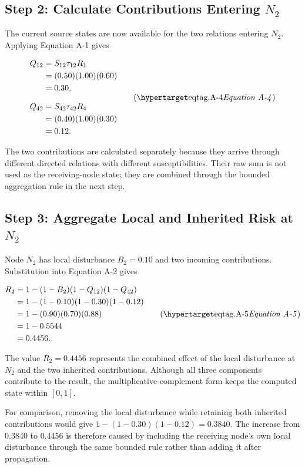 \subsection{Step 2: Calculate Contributions Entering
\texorpdfstring{\(N_2\)}{N2}}

The current source states are now available for the two relations entering
\(N_2\). Applying Equation A-1 gives

\[
\begin{aligned}
Q_{12}
  &=S_{12}\tau_{12}R_1 \\
  &=(0.50)(1.00)(0.60) \\
  &=0.30,\\[0.5\baselineskip]
Q_{42}
  &=S_{42}\tau_{42}R_4 \\
  &=(0.40)(1.00)(0.30) \\
  &=0.12.
\end{aligned}
\eqtag{A-4}
\]

The two contributions are calculated separately because they arrive through
different directed relations with different susceptibilities. Their raw sum
is not used as the receiving-node state; they are combined through the bounded
aggregation rule in the next step.

\subsection{Step 3: Aggregate Local and Inherited Risk at
\texorpdfstring{\(N_2\)}{N2}}

Node \(N_2\) has local disturbance \(B_2=0.10\) and two incoming
contributions. Substitution into Equation A-2 gives

\[
\begin{aligned}
R_2
  &=1-(1-B_2)(1-Q_{12})(1-Q_{42}) \\
  &=1-(1-0.10)(1-0.30)(1-0.12) \\
  &=1-(0.90)(0.70)(0.88) \\
  &=1-0.5544 \\
  &=0.4456.
\end{aligned}
\eqtag{A-5}
\]

The value \(R_2=0.4456\) represents the combined effect of the local
disturbance at \(N_2\) and the two inherited contributions. Although all
three components contribute to the result, the multiplicative-complement
form keeps the computed state within \([0,1]\).

For comparison, removing the local disturbance while retaining both inherited
contributions would give
\(1-(1-0.30)(1-0.12)=0.3840\). The increase from 0.3840 to 0.4456 is therefore
caused by including the receiving node's own local disturbance through the
same bounded rule rather than adding it after propagation.

